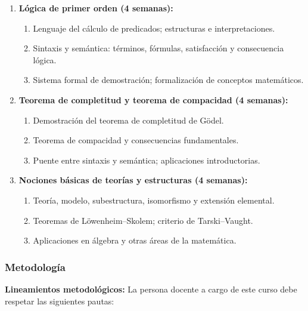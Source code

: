 \begin{refsection}
\begin{enumerate}
\item \textbf{Lógica de primer orden (4 semanas):}
\begin{enumerate}
    \item Lenguaje del cálculo de predicados; estructuras e interpretaciones.
    \item Sintaxis y semántica: términos, fórmulas, satisfacción y consecuencia lógica.
    \item Sistema formal de demostración; formalización de conceptos matemáticos.
\end{enumerate}

\item \textbf{Teorema de completitud y teorema de compacidad (4 semanas):}
\begin{enumerate}
    \item Demostración del teorema de completitud de Gödel.
    \item Teorema de compacidad y consecuencias fundamentales.
    \item Puente entre sintaxis y semántica; aplicaciones introductorias.
\end{enumerate}

\item \textbf{Nociones básicas de teorías y estructuras (4 semanas):}
\begin{enumerate}
    \item Teoría, modelo, subestructura, isomorfismo y extensión elemental.
    \item Teoremas de Löwenheim--Skolem; criterio de Tarski--Vaught.
    \item Aplicaciones en álgebra y otras áreas de la matemática.
\end{enumerate}

\end{enumerate}

\subsubsection*{Metodología}

\noindent \textbf{Lineamientos metodológicos:} La persona docente a cargo de este curso debe respetar las siguientes pautas:


\end{refsection}

